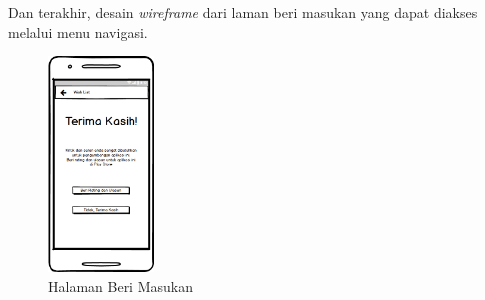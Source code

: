 	Dan terakhir, desain \textit{wireframe} dari laman beri masukan yang dapat diakses melalui menu navigasi.	
		\begin{figure}[H]
			\centering
			\includegraphics[width=0.25\textwidth]{gambar/wireframe/BeriMasukan}
			\caption{Halaman Beri Masukan}
		\end{figure}
